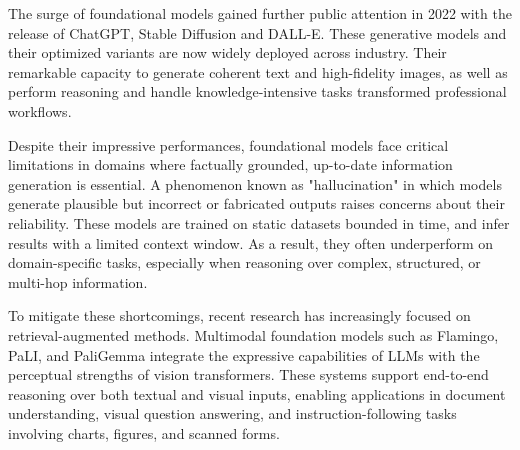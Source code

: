 \documentclass[12pt,twoside]{report}
\begin{document}
The surge of foundational models\cite{FoundationModels} gained further public attention in 2022 with the release of ChatGPT\cite{IntroducingChatGPT}, Stable Diffusion\cite{StableDiffusion} and DALL-E\cite{DALL.E-2}. These generative models and their optimized variants are now widely deployed across industry. Their remarkable capacity to generate coherent text and high-fidelity images, as well as perform reasoning and handle knowledge-intensive tasks transformed professional workflows\cite{FoundationModelsInBigBusiness}.

Despite their impressive performances, foundational models face critical limitations in domains where factually grounded, up-to-date information generation is essential. A phenomenon known as "hallucination"\cite{Hallucinations} in which models generate plausible but incorrect or fabricated outputs raises concerns about their reliability. These models are trained on static datasets bounded in time, and infer results with a limited context window. As a result, they often underperform on domain-specific tasks, especially when reasoning over complex, structured, or multi-hop information\cite{ReasoningOrReciting}. 

To mitigate these shortcomings, recent research has increasingly focused on retrieval-augmented methods. Multimodal foundation models such as Flamingo, PaLI, and PaliGemma integrate the expressive capabilities of LLMs with the perceptual strengths of vision transformers. These systems support end-to-end reasoning over both textual and visual inputs, enabling applications in document understanding, visual question answering, and instruction-following tasks involving charts, figures, and scanned forms.
\end{document}
